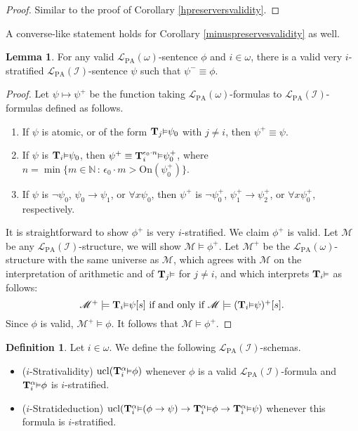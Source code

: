 \documentclass[reqno]{article}
\theoremstyle{definition}
\newtheorem{lemma}[theorem]{Lemma}
\newtheorem{definition}[theorem]{Definition}
\def\N{\mathbb{N}}
\def\L{\mathscr{L}}
\def\T{\mathbf{T}}
\def\LPA{\L_{\mathrm{PA}}}
\def\indset{\mathcal I}
\def\onset{\mathrm{On}}
\renewcommand{\Pr}[1]{\T_{#1}\mbox{\small${\vDash}$}}
\newcommand{\Prr}[2]{\T^{#1}_{#2}\mbox{\small${\vDash}$}}
\newcommand{\ucl}[1]{\mathrm{ucl}(#1)}
\begin{document}
\begin{proof}
Similar to the proof of Corollary \ref{hpreserversvalidity}.
\end{proof}

A converse-like statement holds for Corollary \ref{minuspreservesvalidity} as well.

\begin{lemma}
\label{validitylevator}
For any valid $\LPA(\omega)$-sentence $\phi$ and $i\in\omega$,
there is a valid very $i$-stratified $\LPA(\indset)$-sentence $\psi$
such that $\psi^-\equiv\phi$.
\end{lemma}

\begin{proof}
  Let $\psi\mapsto\psi^+$ be the function taking $\LPA(\omega)$-formulas to
  $\LPA(\indset)$-formulas defined as follows.
  \begin{enumerate}
    \item If $\psi$ is atomic, or of the form $\Pr j\psi_0$ with $j\neq i$,
    then $\psi^+\equiv\psi$.
    \item If $\psi$ is $\Pr i\psi_0$, then $\psi^+ \equiv \Prr {\epsilon_0\cdot n} i \psi_0^+$,
    where $n=\min\{m\in\N\,:\,\epsilon_0\cdot m > \onset(\psi_0^+)\}$.
    \item If $\psi$ is $\neg\psi_0$, $\psi_0\rightarrow\psi_1$, or $\forall x \psi_0$,
    then $\psi^+$ is $\neg\psi_0^+$, $\psi_1^+\rightarrow\psi_2^+$, or $\forall x \psi_0^+$,
    respectively.
  \end{enumerate}
  It is straightforward to show $\phi^+$ is very $i$-stratified.
  We claim $\phi^+$ is valid. Let $\mathscr M$ be any $\LPA(\indset)$-structure,
  we will show $\mathscr M\models\phi^+$.  Let $\mathscr M^+$ be the $\LPA(\omega)$-structure
  with the same universe as $\mathscr M$, which agrees with $\mathscr M$ on the interpretation
  of arithmetic and of $\Pr j$ for $j\not=i$, and which interprets $\Pr i$ as follows:
  \[
    \mbox{
      $\mathscr M^+\models \Pr i \psi[s]$ if and only if $\mathscr M\models (\Pr i\psi)^+[s]$.
    }
  \]
  Since $\phi$ is valid, $\mathscr M^+\models\phi$.
  It follows that $\mathscr M\models\phi^+$.
\end{proof}

\begin{definition}
\label{stratschemasdefn}
Let $i\in\omega$.
We define the following $\LPA(\indset)$-schemas.
\begin{itemize}
\item ($i$-Strativalidity) $\ucl{\Prr\alpha i\phi}$ whenever $\phi$ is a valid $\LPA(\indset)$-formula
and $\Prr\alpha i\phi$ is $i$-stratified.
\item ($i$-Stratideduction) $\ucl{\Prr\alpha i(\phi\rightarrow\psi)\rightarrow\Prr\alpha i\phi\rightarrow \Prr\alpha i\psi}$
whenever this formula is $i$-stratified.
\end{itemize}
\end{definition}
\end{document}
